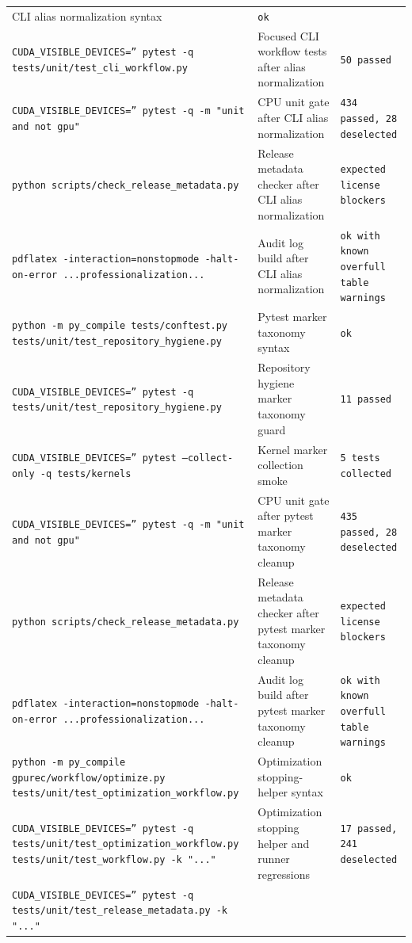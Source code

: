 \documentclass[11pt]{article}
\begin{document}
\begin{center}
\begin{tabular}{lll}
CLI alias normalization syntax &
\texttt{ok} \\
\texttt{CUDA\_VISIBLE\_DEVICES='' pytest -q tests/unit/test\_cli\_workflow.py} &
Focused CLI workflow tests after alias normalization &
\texttt{50 passed} \\
\texttt{CUDA\_VISIBLE\_DEVICES='' pytest -q -m "unit and not gpu"} &
CPU unit gate after CLI alias normalization &
\texttt{434 passed, 28 deselected} \\
\texttt{python scripts/check\_release\_metadata.py} &
Release metadata checker after CLI alias normalization &
\texttt{expected license blockers} \\
\texttt{pdflatex -interaction=nonstopmode -halt-on-error ...professionalization...} &
Audit log build after CLI alias normalization &
\texttt{ok with known overfull table warnings} \\
\texttt{python -m py\_compile tests/conftest.py tests/unit/test\_repository\_hygiene.py} &
Pytest marker taxonomy syntax &
\texttt{ok} \\
\texttt{CUDA\_VISIBLE\_DEVICES='' pytest -q tests/unit/test\_repository\_hygiene.py} &
Repository hygiene marker taxonomy guard &
\texttt{11 passed} \\
\texttt{CUDA\_VISIBLE\_DEVICES='' pytest --collect-only -q tests/kernels} &
Kernel marker collection smoke &
\texttt{5 tests collected} \\
\texttt{CUDA\_VISIBLE\_DEVICES='' pytest -q -m "unit and not gpu"} &
CPU unit gate after pytest marker taxonomy cleanup &
\texttt{435 passed, 28 deselected} \\
\texttt{python scripts/check\_release\_metadata.py} &
Release metadata checker after pytest marker taxonomy cleanup &
\texttt{expected license blockers} \\
\texttt{pdflatex -interaction=nonstopmode -halt-on-error ...professionalization...} &
Audit log build after pytest marker taxonomy cleanup &
\texttt{ok with known overfull table warnings} \\
\texttt{python -m py\_compile gpurec/workflow/optimize.py tests/unit/test\_optimization\_workflow.py} &
Optimization stopping-helper syntax &
\texttt{ok} \\
\texttt{CUDA\_VISIBLE\_DEVICES='' pytest -q tests/unit/test\_optimization\_workflow.py tests/unit/test\_workflow.py -k "..."} &
Optimization stopping helper and runner regressions &
\texttt{17 passed, 241 deselected} \\
\texttt{CUDA\_VISIBLE\_DEVICES='' pytest -q tests/unit/test\_release\_metadata.py -k "..."} &

\end{tabular}
\end{center}
\end{document}
